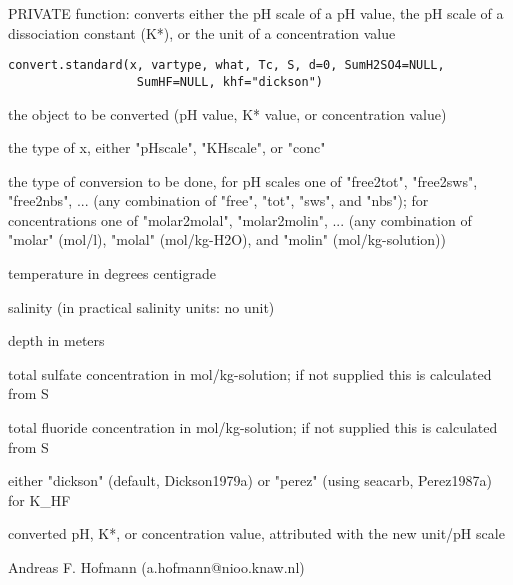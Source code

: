 \documentclass{article}
\begin{document}
\begin{Description}\relax
PRIVATE function: converts either the pH scale of a pH value, the pH scale of a dissociation constant (K*), or the unit of a concentration value
\end{Description}
\begin{Usage}
\begin{verbatim}convert.standard(x, vartype, what, Tc, S, d=0, SumH2SO4=NULL,
                  SumHF=NULL, khf="dickson")\end{verbatim}
\end{Usage}
\begin{Arguments}
\begin{ldescription}
\item[\code{x }] the object to be converted (pH value, K* value, or concentration value)
\item[\code{vartype }] the type of x, either "pHscale", "KHscale", or "conc"
\item[\code{what }] the type of conversion to be done, for pH scales one of "free2tot", "free2sws", "free2nbs", ... (any combination of "free", "tot", "sws", and "nbs"); for concentrations one of "molar2molal", "molar2molin", ... (any combination of "molar" (mol/l), "molal" (mol/kg-H2O), and "molin" (mol/kg-solution))
\item[\code{Tc }] temperature in degrees centigrade
\item[\code{S }] salinity (in practical salinity units: no unit)
\item[\code{d }] depth in meters
\item[\code{SumH2SO4 }] total sulfate concentration in mol/kg-solution; if not supplied this is calculated from S
\item[\code{SumHF }] total fluoride concentration in mol/kg-solution; if not supplied this is calculated from S
\item[\code{khf}] either "dickson" (default, Dickson1979a) or "perez" (using seacarb, Perez1987a) for K\_HF
\end{ldescription}
\end{Arguments}
\begin{Value}
converted pH, K*, or concentration value, attributed with the new unit/pH scale
\end{Value}
\begin{Author}\relax
Andreas F. Hofmann (a.hofmann@nioo.knaw.nl)
\end{Author}
\end{document}
